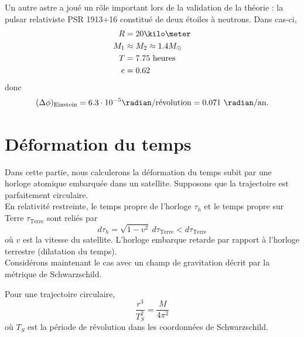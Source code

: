 \documentclass[a4paper,11pt]{report}
\begin{document}
            Un autre astre a joué un rôle important lors de la validation de la théorie : la pulsar relativiste PSR 1913+16 constitué de deux étoiles à neutrons. Dans cas-ci,
            \begin{align}
                R &= 20\kilo\meter\\
                M_1 &\approx M_2 \approx 1.4M_{\odot}\\
                T &= 7.75\text{ heures}\\
                e &= 0.62
            \end{align}
            donc
            \begin{equation}
                (\Delta\phi)_{\text{Einstein}} = 6.3\cdot10^{-5}\radian/\text{révolution} = 0.071~\radian/\text{an}.
            \end{equation}
            
    \section{Déformation du temps}
    
        Dans cette partie, nous calculerons la déformation du temps subit par une horloge atomique embarquée dans un satellite. Supposons que la trajectoire est parfaitement circulaire.\\
        
        En relativité restreinte, le temps propre de l'horloge $\tau_h$ et le temps propre sur Terre $\tau_{\text{Terre}}$ sont reliés par
        \begin{equation}
            d\tau_h = \sqrt{1-v^2}~d\tau_{\text{Terre}} < d\tau_{\text{Terre}}
        \end{equation}
        où $v$ est la vitesse du satellite. L'horloge embarque retarde par rapport à l'horloge terrestre (dilatation du temps).\\
        
        Considérons maintenant le cas avec un champ de gravitation décrit par la métrique de Schwarzschild.
        
        \begin{prop}\begin{leftbar}
            Pour une trajectoire circulaire, 
            \begin{equation}
                \frac{r^3}{T^2_S} = \frac{M}{4\pi^2}
            \end{equation}
            où $T_S$ est la période de révolution dans les coordonnées de Schwarzschild.
        \end{leftbar}\end{prop}
        
\end{document}
